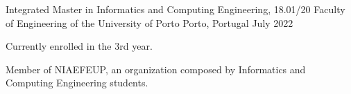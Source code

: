
\begin{cventries}
  \cventry
    {Integrated Master in Informatics and Computing Engineering, 18.01/20} %
    {Faculty of Engineering of the University of Porto} %
    {Porto, Portugal} %
    {July 2022} %
    {
      \begin{cvitems}
        \item {Currently enrolled in the 3rd year.}
        \item {Member of NIAEFEUP, an organization composed by Informatics and Computing Engineering students.}
      \end{cvitems}
    }
\end{cventries}

